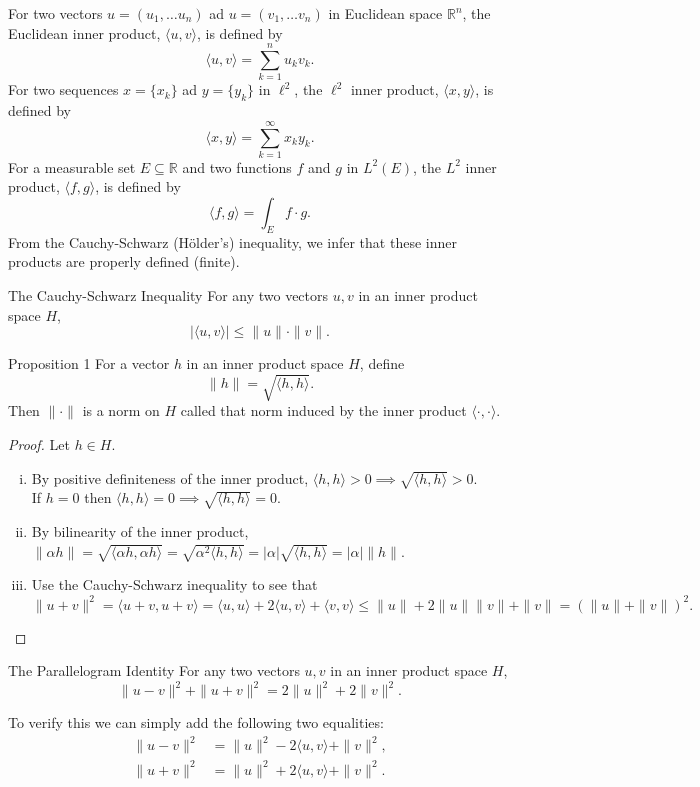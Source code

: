 For two vectors $u=(u_1,\dots u_n)$ ad $u=(v_1,\dots v_n)$ in Euclidean space $\mathbb{R}^n$, the Euclidean inner product, $\langle u,v\rangle$, is defined by
\[
    \langle u,v\rangle=\sum_{k=1}^nu_kv_k.
\]
For two sequences $x=\{x_k\}$ ad $y=\{y_k\}$ in $\ell^2$, the $\ell^2$ inner product, $\langle x,y \rangle$, is defined by
\[
    \langle x,y\rangle=\sum_{k=1}^\infty x_ky_k.
\]
For a measurable set $E\subseteq\mathbb{R}$ and two functions $f$ and $g$ in $L^2(E)$, the $L^2$ inner product, $\langle f,g \rangle$, is defined by
\[
    \langle f,g\rangle=\int_Ef\cdot g.
\]
From the Cauchy-Schwarz (H\"older's) inequality, we infer that these inner products are properly defined (finite).
\begin{namedthm*}{The Cauchy-Schwarz Inequality}
    For any two vectors $u,v$ in an inner product space $H$,
    \[
        |\langle u,v\rangle|\le\|u\|\cdot\|v\|.
    \]
\end{namedthm*}
\begin{namedthm*}{Proposition 1}
    For a vector $h$ in an inner product space $H$, define
    \[
        \|h\|=\sqrt{\langle h,h\rangle}.
    \]
    Then $\|\cdot\|$ is a norm on $H$ called that norm induced by the inner product $\langle\cdot,\cdot\rangle$.
\end{namedthm*}
\begin{proof}
    Let $h\in H$.
    \begin{enumerate}[(i)]
        \item By positive definiteness of the inner product, $\langle h,h\rangle>0\implies \sqrt{\langle h,h\rangle}>0$.
        \\If $h=0$ then $\langle h,h\rangle=0\implies\sqrt{\langle h,h\rangle}=0$.
        \item By bilinearity of the inner product, $\|\alpha h\|=\sqrt{\langle \alpha h,\alpha h\rangle}=\sqrt{\alpha^2\langle h,h\rangle}=|\alpha|\sqrt{\langle h,h\rangle} =|\alpha|\|h\|$.
        \item Use the Cauchy-Schwarz inequality to see that 
        \[
            \|u+v\|^2=\langle u+v,u+v\rangle=\langle u,u\rangle+2\langle u,v\rangle+\langle v,v\rangle\le \|u\|+2\|u\|\|v\|+\|v\|=(\|u\|+\|v\|)^2.
        \]
    \end{enumerate}
\end{proof}
\begin{namedthm*}{The Parallelogram Identity}
    For any two vectors $u,v$ in an inner product space $H$,
    \[
        \|u-v\|^2+\|u+v\|^2=2\|u\|^2+2\|v\|^2.
    \]
\end{namedthm*}
To verify this we can simply add the following two equalities:
\begin{align*}
    \|u-v\|^2&=\|u\|^2-2\langle u,v\rangle+\|v\|^2,\\
    \|u+v\|^2&=\|u\|^2+2\langle u,v\rangle+\|v\|^2.
\end{align*}

